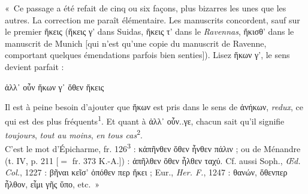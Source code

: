 \documentclass[12pt]{book}%
\newcommand{\italique}[1]{\textit{#1}}%
\newcommand{\citComm}[1]{\begin{quoting}[vskip=0pt] #1 \end{quoting}}%
\newcommand{\francais}[1]{{\policeFr #1}}%
\newcommand{\marqueur}[1]{\textsuperscript{#1}}%
\newcommand{\eff}[1]{%
{\color{orange}#1}%
}%
\newenvironment{groupe}{%
\pstart%
\ledgroup%
}{%
\pend %
}%
\begin{document}
\begin{pages}
\begin{Leftside}
\begin{groupe}
{{«~Ce passage a été refait de cinq ou six façons, plus bizarres les unes que les autres. 
La correction me paraît élémentaire. Les manuscrits concordent, sauf sur le premier ἥκεις (ἥκεις γ' dans Suidas, ἥκεις τ' dans le \italique{Ravennas}, ἥκισθ' dans le manuscrit de Munich [qui n'est qu'une copie du manuscrit de Ravenne, comportant quelques émendations parfois bien senties]). Lisez ἥκων γ', le sens devient parfait :
\citComm{ἀλλ᾽ οὖν ἥκων γ᾽ ὅθεν ἥκεις}
Il est à peine besoin d'ajouter que ἥκων est pris dans le sens de ἀνήκων, \italique{redux}, ce qui est des plus fréquents\marqueur{1}. Et quant à ἀλλ᾽ οὖν..γε, chacun sait qu'il signifie \italique{toujours}, \italique{tout au moins}, \italique{en tous cas}\marqueur{2}.\\
C'est le mot d'Épicharme, fr. 126\marqueur{3} : κἀπῆνθεν ὅθεν ἦνθεν πάλιν ; ou de Ménandre (t. IV, p. 211 [$=$ fr. 373 K.-A.]) : ἀπῆλθεν ὅθεν ἦλθεν ταχύ. Cf. aussi Soph., \italique{Œd. Col.}, 1227 : βῆναι κεῖσ' ὁπόθεν περ ἥκει ; Eur., \italique{Her. F.}, 1247 : θανών, ὅθενπερ ἦλθον, εἶμι γῆς ὕπο, etc.~»

}}
\end{groupe}
\end{Leftside}
\end{pages}
\end{document}
